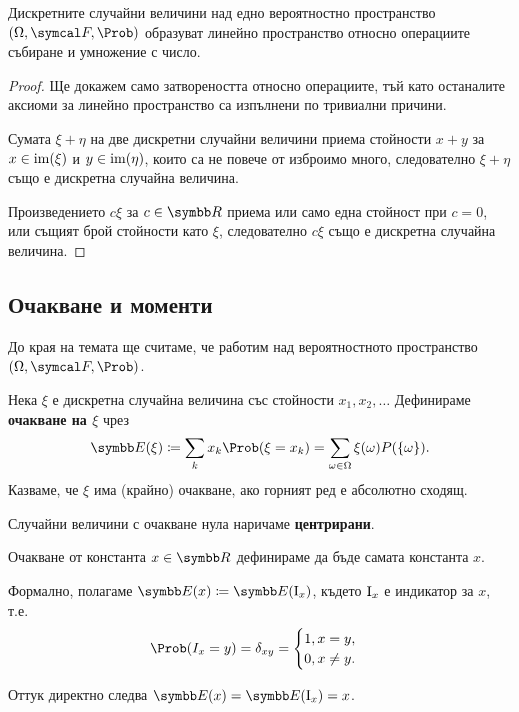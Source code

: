 \documentclass[numbers=endperiod, bibliography=totocnumbered]{scrartcl}
\begin{document}
\begin{proposition}
  Дискретните случайни величини над едно вероятностно пространство \( (\Omega, \F, \Prob) \) образуват линейно пространство относно операциите събиране и умножение с число.
\end{proposition}
\begin{proof}
  Ще докажем само затвореността относно операциите, тъй като останалите аксиоми за линейно пространство са изпълнени по тривиални причини.

  Сумата \( \xi + \eta \) на две дискретни случайни величини приема стойности \( x + y \) за \( x \in \operatorname{im}(\xi) \) и \( y \in \operatorname{im}(\eta) \), които са не повече от изброимо много, следователно \( \xi + \eta \) също е дискретна случайна величина.

  Произведението \( c \xi \) за \( c \in \R \) приема или само една стойност при \( c = 0 \), или същият брой стойности като \( \xi \), следователно \( c \xi \) също е дискретна случайна величина.
\end{proof}

\subsection{Очакване и моменти}

До края на темата ще считаме, че работим над вероятностното пространство \( (\Omega, \F, \Prob) \).

\begin{definition}
  Нека \( \xi \) е дискретна случайна величина със стойности \( x_1, x_2, \ldots \) Дефинираме \textbf{очакване на \( \xi \)} чрез
  \begin{equation*}
    \Expect(\xi) \coloneqq \sum_k x_k \Prob(\xi = x_k) = \sum_{\omega \in \Omega} \xi(\omega) P(\{ \omega \}).
  \end{equation*}
  Казваме, че \( \xi \) има (крайно) очакване, ако горният ред е абсолютно сходящ.

  Случайни величини с очакване нула наричаме \textbf{центрирани}.

  Очакване от константа \( x \in \R \) дефинираме да бъде самата константа \( x \).
\end{definition}

\begin{remark}
  Формално, полагаме \( \Expect(x) \coloneqq \Expect(\Ind_x) \), където \( \operatorname{I}_x \) е индикатор за \( x \), т.е.
  \begin{equation*}
    \Prob(I_x = y) = \delta_{xy} = \begin{cases}
      1, x = y, \\
      0, x \neq y.
    \end{cases}
  \end{equation*}

  Оттук директно следва \( \Expect(x) = \Expect(\Ind_x) = x \).
\end{remark}
\end{document}

